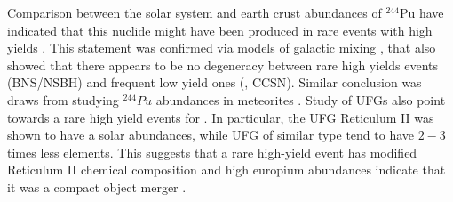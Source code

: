 %
%
Comparison between the solar system and earth crust abundances of $^{244}$Pu have indicated that this 
nuclide might have been produced in rare events with high yields \citep{Wallner:2015}. This statement 
was confirmed via models of galactic mixing \citep{Hotokezaka:2015zea}, that also showed that there 
appears to be no degeneracy between rare high yields events (\ac{BNS}/\ac{NSBH}) 
and frequent low yield ones (\ie, \ac{CCSN}). Similar conclusion was draws from studying $^{244}Pu$ 
abundances in meteorites \citep{Tsujimoto:2017}.
%
Study of \acp{UFG} also point towards a rare high yield events for \rproc{} \nuc{}. In particular, 
the \ac{UFG} Reticulum II was shown to have a solar \rproc{} abundances, while \ac{UFG} of similar 
type tend to have $2-3$ times less \rproc{} elements. This suggests that a rare high-yield event 
has modified Reticulum II chemical composition and high europium abundances indicate that it was a 
compact object merger \citep{Ji:2016}. 
%

